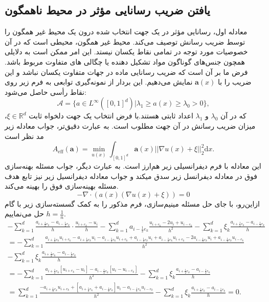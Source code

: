 \subsection*{یافتن ضریب رسانایی مؤثر در محیط ناهمگون}
معادله اول، رسانایی مؤثر در یک جهت انتخاب شده درون یک محیط غیر همگون را توسط ضریب رسانش توصیف می‌کند. محیط غیر همگون، محیطی است که در آن خصوصیات مورد توجه در تمامی نقاط یکسان نیستد. این امر ممکن است به دلایلی همچون جنس‌های گوناگون مواد تشکیل دهنده یا چگالی های متفاوت مربوط باشد. فرض ما بر آن است که ضریب رسانایی ماده در جهات متفاوت یکسان نباشد و این ضریب را با $\bm{a}(x)$ نمایش می‌دهیم. این بردار از نمونه‌گیری توابعی به فرم زیر روی نقاط رأسی حاصل می‌شود:
\begin{equation}
	\mathscr{A} = \{a\in L^{\infty}([0,1]^d) | \lambda_{1} \geq a(x) \geq \lambda_{0} > 0 \},
\end{equation}
که در آن $\lambda_{0}$ و $\lambda_{1}$ اعداد ثابتی هستند.با فرض انتخاب یک جهت دلخواه ثابت $\xi \in \mathbb{R}^d$، میزان ضریب رسانش در آن جهت مطلوب است. به عبارت دقیق‌تر، جواب معادله زیر مد نظر است
\begin{equation*}
A_{\text{eff}}(\bm{a}) = \min_{u(x)} \int_{[0,1]^d} \bm{a}(x) ||\nabla u(x) + \xi||_{2}^{2} \mathrm{d}x.
\end{equation*}
این معادله با فرم دیفرانسیلی زیر هم‌ارز است. به عبارت دیگر، جواب مسئله بهنه‌سازی فوق در معادله دیفرانسل زیر سدق میکند و جواب معادله دیفرانسیل زیر نیز تابع هدف مسئله بهینه‌سازی فوق را بهینه می‌کند.
\begin{equation}
	-\nabla \cdot (a(x)(\nabla u(x)+\xi)) = 0 
\end{equation}
ازاین‌رو، با جای حل مسئله مینیم‌سازی، فرم مذکور را به کمک گسسته‌سازی زیر با گام $h=\frac{1}{n}$ حل می‌نماییم.
\begin{multline*}
	-\sum_{k=1}^{d} \frac{a_{i+\frac{1}{2}e_{k}} - a_{i-\frac{1}{2}e_{k}}}{h} \cdot \frac{u_{i+e_{k}} - u_{i}}{h} - \sum_{k=1}^{d} a_{i-\frac{1}{2} e_k}  \frac{u_{i+e_{k}} - 2 u_{i} + u_{i-e_{k}}}{h^2} - \sum_{k=1}^{d} \xi_k \frac{a_{i+\frac{1}{2}e_{k}} - a_{i-\frac{1}{2}e_{k}}}{h} \\
	= - \sum_{k=1}^{d} \frac{ a_{i+\frac{1}{2}e_{k}} u_{i+e_k} - a_{i+\frac{1}{2}e_{k}} u_i - a_{i-\frac{1}{2}e_{k}} u_{i+e_k} + a_{i-\frac{1}{2}e_{k}} u_i + a_{i-\frac{1}{2}e_{k}} u_{i+e_k} - 2 a_{i-\frac{1}{2}e_{k}} u_i + a_{i-\frac{1}{2}e_{k}} u_{i-e_k}}{h^2} \\ - \sum_{k=1}^{d} \xi_k \frac{a_{i+\frac{1}{2}e_{k}} - a_{i-\frac{1}{2}e_{k}}}{h} \\
	= - \sum_{k=1}^{d} \frac{ a_{i+\frac{1}{2}e_{k}} [u_{i+e_k} - u_i] -  a_{i-\frac{1}{2}e_{k}} [u_i - u_{i-e_k}]}{h^2} - \sum_{k=1}^{d} \xi_k \frac{a_{i+\frac{1}{2}e_{k}} - a_{i-\frac{1}{2}e_{k}}}{h}  \\
	= \sum_{k=1}^{d} \frac{- a_{i+\frac{1}{2}e_{k}} u_{i+e_k} + [a_{i+\frac{1}{2}e_{k}} + a_{i-\frac{1}{2}e_{k}}] u_i - a_{i-\frac{1}{2}e_{k}} u_{i-e_k}}{h^2} - \sum_{k=1}^{d} \xi_k \frac{a_{i+\frac{1}{2}e_{k}} - a_{i-\frac{1}{2}e_{k}}}{h} = 0.
\end{multline*}
